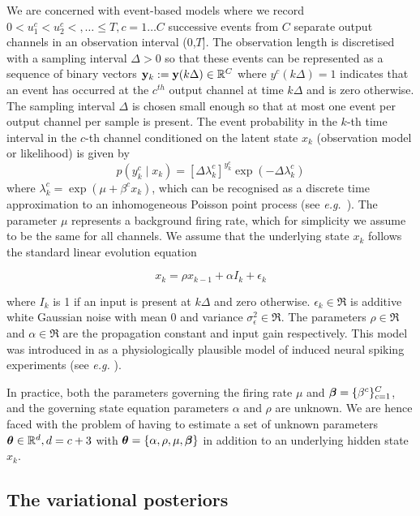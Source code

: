 \documentclass{article}
\begin{document}
We are concerned with event-based models where  we record $0 < u_1^c < u_2^c <, \dots  \le T, c = 1
\dots C$ successive events from $C$ separate output channels in an observation interval (0,$T$]. The
observation length is discretised with a sampling interval $\Delta > 0$ so that these events can be
represented as a sequence of binary vectors ${\bf y}_k := {\bf y}(k\Delta) \in \mathbb{R}^C$ where $y^c(k\Delta) = 1$
indicates that an event has occurred at the $c^{th}$ output channel at time $k\Delta$ and is zero
otherwise. The sampling interval $\Delta$ is chosen small enough so that at most one event per
output channel per sample is present.  The event probability in the $k$-th time interval in the
$c$-th channel conditioned on the latent state $x_k$ (observation model or likelihood) is given by
\begin{equation} p(y^c_k \mid x_k) = [\Delta \lambda^c_k]^{y^c_k}\exp(-\Delta
	\lambda^c_k)\label{spikeLike} \end{equation} where $\lambda^c_k = \exp(\mu + \beta^c x_k)$,
	which can be recognised as a discrete time approximation to an inhomogeneous Poisson point
	process (see {\em e.g.}~\cite{Daley_2003}). The parameter $\mu$ represents a background
	firing rate, which for simplicity we assume to be the same for all channels. We assume that
	the underlying state $x_k$ follows the standard linear evolution equation

\begin{equation} x_k = \rho x_{k-1} + \alpha I_k + \epsilon_k \end{equation}

\noindent where $I_k$ is 1 if an input is present at $k\Delta$ and zero otherwise. $\epsilon_k \in
\Re$ is additive white Gaussian noise with mean 0 and variance $\sigma^2_\epsilon \in \Re$. The
parameters $\rho \in \Re$ and $\alpha \in \Re$ are the propagation constant and input gain
respectively.  This model was introduced in \cite{Smith_2003} as a physiologically plausible model
of induced neural spiking experiments (see {\em e.g.} \cite{Ergun_2007}).

In practice, both the parameters governing the firing rate $\mu$ and ${\bm \beta} = \{\beta^c\}_{c=1}^C$,
and the governing state equation parameters $\alpha$ and $\rho$ are unknown. We are hence faced with
the problem of having to estimate a set of unknown parameters ${\bm \theta} \in \mathbb{R}^d, d = c+3$ with
${\bm \theta} = \{\alpha,\rho,\mu,{\bm \beta}\}$ in addition to an underlying hidden state $x_k$.

\subsection{The variational posteriors}
\end{document}
